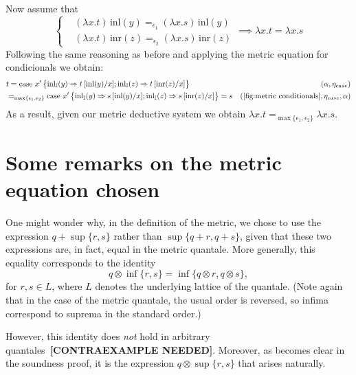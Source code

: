 Now assume that 
\[
\left\{
\begin{aligned}
&(\lambda x.t)\, \text{inl}(y) =_{\epsilon_1} (\lambda x.s)\, \text{inl}(y) \\
&(\lambda x.t)\, \text{inr}(z) =_{\epsilon_2}(\lambda x.s)\, \text{inr}(z)
\end{aligned}
\right.
\implies \lambda x.t = \lambda x.s
\]
Following the same reasoning as before and applying the metric equation for condicionals we obtain:
\begin{equation*}
\begin{split}
  &t =  \text{case } x'  
    \left\{ \begin{aligned}
    \inl_{\typeI}(y) \Rightarrow t\,[\text{inl}(y)/x] ;  
    \inl_{\typeI}(z) \Rightarrow t\,[\text{inr}(z)/x]
  \end{aligned}  \right\} & (\alpha,\eta_{case})\\
  &=_{\max \{\epsilon_1,\epsilon_2\}} \text{case } x'  
    \left\{ \begin{aligned}
    \inl_{\typeI}(y) \Rightarrow s\,[\text{inl}(y)/x] ;  
    \inl_{\typeI}(z) \Rightarrow s\,[\text{inr}(z)/x]
  \end{aligned}  \right\} = s & (\text{\autoref{fig:metric conditionals}},\eta_{case},\alpha)
\end{split}
\end{equation*}
As a result, given our metric deductive system we obtain $\lambda x.t =_{\max \{\epsilon_1,\epsilon_2\}} \lambda x.s$.


\section{Some remarks on the metric equation chosen}


One might wonder why, in the definition of the metric, we chose to use the expression \( q + \sup\{r, s\} \) rather than \( \sup\{q + r, q + s\} \), given that these two expressions are, in fact, equal in the metric quantale. More generally, this equality corresponds to the identity
\[
q \otimes \inf\{r, s\} = \inf\{q \otimes r, q \otimes s\},
\]
for \( r, s \in L \), where \( L \) denotes the underlying lattice of the quantale. (Note again that in the case of the metric quantale, the usual order is reversed, so infima correspond to suprema in the standard order.)

However, this identity does \emph{not} hold in arbitrary quantales~\textbf{[CONTRAEXAMPLE NEEDED]}. Moreover, as becomes clear in the soundness proof, it is the expression \( q \otimes \sup\{r, s\} \) that arises naturally. 
